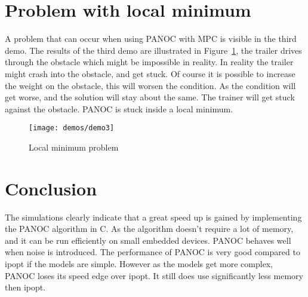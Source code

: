 \section{Problem with local minimum}
A problem that can occur when using PANOC with MPC is visible in the third demo. The results of the third demo are illustrated in Figure~\ref{fig:demo: local minimum problem}, the trailer drives through the obstacle which might be impossible in reality. In reality the trailer might crash into the obstacle, and get stuck. Of course it is possible to increase the weight on the obstacle, this will worsen the condition. As the condition will get worse, and the solution will stay about the same. The trainer will get stuck against the obstacle. PANOC is stuck inside a local minimum.

\begin{figure}[H]
	\centering
	\texttt{[image: demos/demo3]}
	\caption{Local minimum problem}
	\label{fig:demo: local minimum problem}
\end{figure}

\section{Conclusion}

The simulations clearly indicate that a great speed up is gained by implementing the PANOC algorithm in C. As the algorithm doesn't require a lot of memory, and it can be run efficiently on small embedded devices. PANOC behaves well when noise is introduced. The performance of PANOC is very good compared to ipopt if the models are simple. However as the models get more complex, PANOC loses its speed edge over ipopt. It still does use significantly less memory then ipopt.